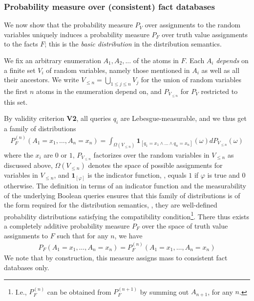 
\subsubsection{Probability measure over (consistent) fact databases}
We now show that the probability measure $P_V$ over assignments to the random variables uniquely induces a probability measure $P_F$ over truth value assignments to the facts $F$; this is the \emph{basic distribution} in the distribution semantics.

We fix an arbitrary enumeration  $A_1,A_2,...$ of the atoms in $F$. 
Each $A_i$ \emph{depends} on a finite set $V_i$ of random variables, namely  those mentioned in $A_i$ as well as all their ancestors. We write $V_{\leq n}=\bigcup_{1\leq j\leq n}V_j $ for the union of random variables the first $n$ atoms in the enumeration depend on, and $P_{V_{\leq n}}$ for $P_V$ restricted to this set.  

By validity criterion {\bf V2}, all queries $q_i$ are  Lebesgue-measurable, and we thus get a family of distributions
\begin{align}
P_F^{(n)}(A_1=x_1,\ldots,A_n=x_n) = \int_{\Omega(V_{\leq n})} \mathbf{1}_{[q_1=x_1\wedge\ldots\wedge q_n=x_n]}(\omega)dP_{V_{\leq n}}(\omega)
\end{align}
where the $x_i$ are $0$ or $1$, $P_{V_{\leq n}}$ factorizes over the random variables in $V_{\leq n}$ as discussed above, $\Omega(V_{\leq n})$ denotes the space of possible assignments for variables in $V_{\leq n}$, and $\mathbf{1}_{[\varphi]}$ is the indicator function, \ie, equals $1$ if $\varphi$ is true and $0$ otherwise. The definition in terms of an indicator function and the measurability of the underlying Boolean queries ensures that this family of distributions is of the form required for the distribution semantics, \ie, they are well-defined probability distributions satisfying the compatibility condition\footnote{I.e., $P_F^{(n)}$ can be obtained from $P_F^{(n+1)}$ by summing out $A_{n+1}$, for any $n$.}. There thus exists a completely additive probability measure $P_F$ over the space of truth value assignments to $F$ such that for any $n$, we have
\begin{align}
P_F(A_1=x_1,\ldots,A_n=x_n) =P_F^{(n)}(A_1=x_1,\ldots,A_n=x_n)
\end{align}
We note that by construction, this measure assigns mass to consistent fact databases only. 

